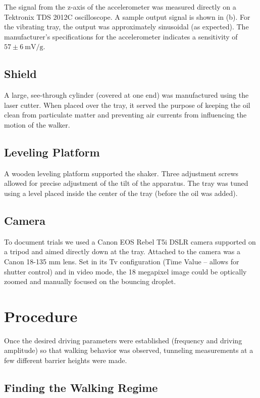       The signal from the z-axis of the accelerometer was measured directly on a Tektronix TDS 2012C oscilloscope. A sample output signal is shown in (b). For the vibrating tray, the output was approximately sinusoidal (as expected). The manufacturer's specifications for the accelerometer indicates a sensitivity of $57 \pm 6~\mathrm{mV/g}$. 
    
\subsection{Shield}
    A large, see-through cylinder (covered at one end) was manufactured using the laser cutter. When placed over the tray, it served the purpose of keeping the oil clean from particulate matter and preventing air currents from influencing the motion of the walker.       
   
\subsection{Leveling Platform}
    A wooden leveling platform supported the shaker. Three adjustment screws allowed for precise adjustment of the tilt of the apparatus. The tray was tuned using a level placed inside the center of the tray (before the oil was added). 

\subsection{Camera}       
 
To document trials we used a Canon EOS Rebel T5i DSLR camera supported on a tripod and aimed directly down at the tray. Attached to the camera was a Canon 18-135 mm lens. Set in its Tv configuration (Time Value -- allows for shutter control) and in video mode, the 18 megapixel image could be optically zoomed and manually focused on the bouncing droplet. 

\section{Procedure}
Once the desired driving parameters were established (frequency and driving amplitude) so that walking behavior was observed, tunneling measurements at a few different barrier heights were made. 

\subsection{Finding the Walking Regime}

